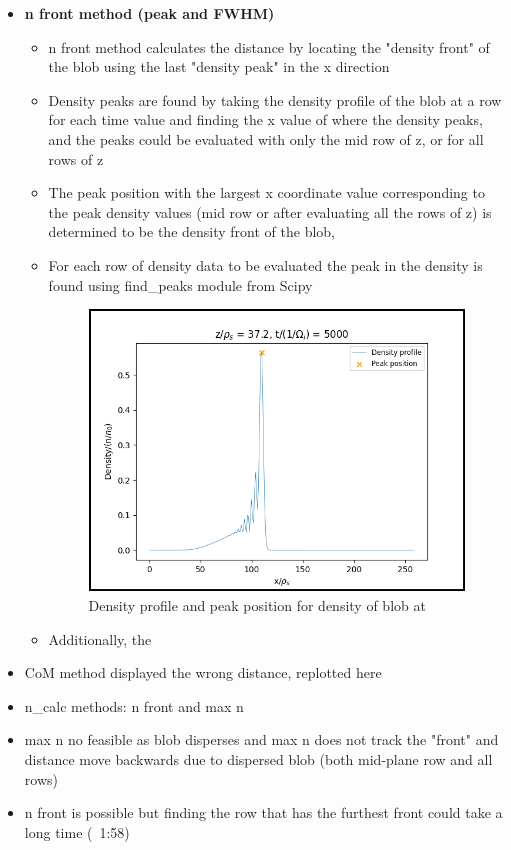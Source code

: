\documentclass{article}
\begin{document}
\begin{arrowlist}
\begin{itemize}
            \item \textbf{n front method (peak and FWHM)}
            \begin{itemize}
                \item n front method calculates the distance by locating the "density front" of the blob using the last "density peak" in the x direction
                \item Density peaks are found by taking the density profile of the blob at a row for each time value and finding the x value of where the density peaks, and the peaks could be evaluated with only the mid row of z, or for all rows of z
                \item The peak position with the largest x coordinate value corresponding to the peak density values (mid row or after evaluating all the rows of z) is determined to be the density front of the blob, 
                \item For each row of density data to be evaluated the peak in the density is found using find\_peaks module from Scipy 
    \begin{figure}[H]
        \centering
        \includegraphics[height=0.5\textheight]{./Fig/Fig9 n front n peak plot.png}
        \normalsize{\caption{Density profile and peak position for density of blob at }
        \label{fig:fig9}}
    \end{figure}  
                \item Additionally, the 
            \end{itemize}
            
            \item CoM method displayed the wrong distance, replotted here
            \item n\_calc methods: n front and max n
            \item max n no feasible as blob disperses and max n does not track the "front" and distance move backwards due to dispersed blob (both mid-plane row and all rows)
            \item n front is possible but finding the row that has the furthest front could take a long time (~1:58)
        \end{itemize}
    
\end{arrowlist}



\nocite{*}
\printbibliography[title={References}]
\end{document}
